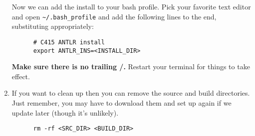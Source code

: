 \documentclass[../setup.tex]{subfiles}
\begin{document}
\begin{enumerate}
    Now we can add the install to your bash profile. Pick your favorite text editor and open
    \lstinline{~/.bash_profile} and add the following lines to the end, substituting appropriately:
    \begin{lstlisting}
      # C415 ANTLR install
      export ANTLR_INS=<INSTALL_DIR>
    \end{lstlisting}
    \textbf{Make sure there is no trailing /.} Restart your terminal for things to take effect.
  \item
    If you want to clean up then you can remove the source and build directories. Just remember,
    you may have to download them and set up again if we update later (though it's unlikely).
    \begin{lstlisting}
      rm -rf <SRC_DIR> <BUILD_DIR>
    \end{lstlisting}
\end{enumerate}
\end{document}
